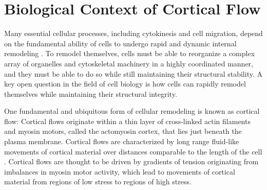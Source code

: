 
\section{Biological Context of Cortical Flow}
Many essential cellular processes, including cytokinesis and cell migration, depend on the fundamental ability of cells to undergo rapid and dynamic internal remodeling \cite{bhl28884}. To remodel themselves, cells must be able to reorganize a complex array of organelles and cytoskeletal machinery in a highly coordinated manner, and they must be able to do so while still maintaining their structural stability.   A key open question in the field of cell biology is how cells can rapidly remodel themselves while maintaining their structural integrity.

One fundamental and ubiquitous form of cellular remodeling is known as cortical flow:  Cortical flows originate within a thin layer of cross-linked actin filaments and myosin motors, called the actomyosin cortex, that lies just beneath the plasma membrane\cite{Munro2004413}. Cortical flows are characterized by long range fluid-like movements of cortical material over distances comparable to the length of the cell \cite{doi:10.1146/annurev-cellbio-100109-104027}.  Cortical flows are thought to be driven by gradients of tension originating from imbalances in myosin motor activity, which lead to movements of  cortical material from regions of low stress to regions of high stress\cite{cellmech_flows3}.

